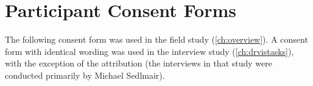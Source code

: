 
\chapter[Appendix: Consent Forms]{Participant Consent Forms}
\label{app-consent}


The following consent form was used in the field study (\autoref{ch:overview}).
A consent form with identical wording was used in the interview study (\autoref{ch:drvistasks}), with the exception of the attribution (the interviews in that study were conducted primarily by Michael Sedlmair).

